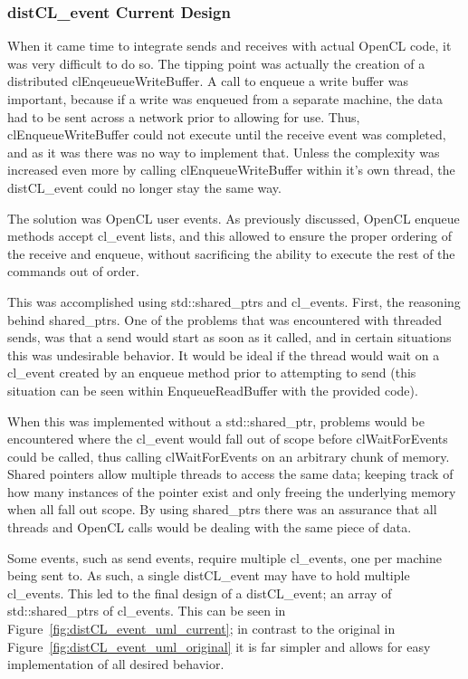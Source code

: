 \documentclass[../thesis.tex]{subfiles}
\begin{document}
        \subsubsection{distCL\_event Current Design} %
        \label{ssub:distcl_event_current_design}
            When it came time to integrate sends and receives with actual OpenCL code, it was very difficult to do so. The tipping point was actually the creation of a distributed clEnqeueueWriteBuffer. A call to enqueue a write buffer was important, because if a write was enqueued from a separate machine, the data had to be sent across a network prior to allowing for use. Thus, clEnqueueWriteBuffer could not execute until the receive event was completed, and as it was there was no way to implement that. Unless the complexity was increased even more by calling clEnqueueWriteBuffer within it's own thread, the distCL\_event could no longer stay the same way.

            The solution was OpenCL user events. As previously discussed, OpenCL enqueue methods accept cl\_event lists, and this allowed to ensure the proper ordering of the receive and enqueue, without sacrificing the ability to execute the rest of the commands out of order.

            This was accomplished using std::shared\_ptrs and cl\_events. First, the reasoning behind shared\_ptrs. One of the problems that was encountered  with threaded sends, was that a send would start as soon as it called, and in certain situations this was undesirable behavior. It would be ideal if the thread would wait on a cl\_event created by an enqueue method prior to attempting to send (this situation can be seen within EnqueueReadBuffer with the provided code). 

            When this was implemented without a std::shared\_ptr, problems would be encountered where the cl\_event would fall out of scope before clWaitForEvents could be called, thus calling clWaitForEvents on an arbitrary chunk of memory. Shared pointers allow multiple threads to access the same data; keeping track of how many instances of the pointer exist and only freeing the underlying memory when all fall out scope. By using shared\_ptrs there was an assurance that all threads and OpenCL calls would be dealing with the same piece of data.

            Some events, such as send events, require multiple cl\_events, one per machine being sent to. As such, a single distCL\_event may have to hold multiple cl\_events. This led to the final design of a distCL\_event; an array of std::shared\_ptrs of cl\_events. This can be seen in Figure~\ref{fig:distCL_event_uml_current}; in contrast to the original in Figure~\ref{fig:distCL_event_uml_original} it is far simpler and allows for easy implementation of all desired behavior.
            
\end{document}
